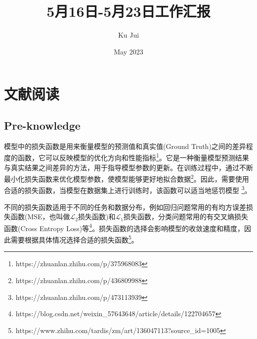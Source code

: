 \documentclass[letterpaper,12pt]{article}
\begin{document}
	
	
	\title{\songti {}5月16日-5月23日工作汇报}
	\author{\textrm{Ku Jui}}
	\date{\textrm{May 2023}}
	\maketitle
	
	\renewcommand{\figurename}{Figure} %
	\renewcommand{\contentsname}{Contents}
	
	\tableofcontents  %
	
	\section{文献阅读}
	
	\subsection{Pre-knowledge}
	
	模型中的损失函数是用来衡量模型的预测值和真实值(Ground Truth)之间的差异程度的函数，它可以反映模型的优化方向和性能指标\footnote{https://zhuanlan.zhihu.com/p/375968083}。它是一种衡量模型预测结果与真实结果之间差异的方法，用于指导模型参数的更新。在训练过程中，通过不断最小化损失函数来优化模型参数，使模型能够更好地拟合数据\footnote{https://zhuanlan.zhihu.com/p/436809988}。因此，需要使用合适的损失函数，当模型在数据集上进行训练时，该函数可以适当地惩罚模型 \footnote{https://zhuanlan.zhihu.com/p/473113939}。
	
	不同的损失函数适用于不同的任务和数据分布，例如回归问题常用的有均方误差损失函数(MSE，也叫做$\mathcal{L}_{2}$损失函数)和$\mathcal{L}_{1}$损失函数，分类问题常用的有交叉熵损失函数(Cross Entropy Loss)等\footnote{https://blog.csdn.net/weixin\_57643648/article/details/122704657}。损失函数的选择会影响模型的收敛速度和精度，因此需要根据具体情况选择合适的损失函数\footnote{https://www.zhihu.com/tardis/zm/art/136047113?source\_id=1005}。
	
\end{document}
